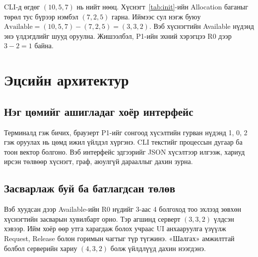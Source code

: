  CLI-д өгдөг $(10,5,7)$ нь нийт нөөц. Хүснэгт~\ref{tab:init}-ийн Allocation баганыг төрөл тус бүрээр нэмбэл $(7,2,5)$ гарна. Иймээс сул нэгж буюу $\mathrm{Available}=(10,5,7)-(7,2,5)=(3,3,2)$. Вэб хүснэгтийн Available нүдэнд энэ үлдэгдлийг шууд оруулна. Жишээлбэл, P1-ийн эхний хэрэгцээ R0 дээр $3-2=1$ байна.
\newpage
\section{Эцсийн архитектур}
\subsection{Нэг цөмийг ашигладаг хоёр интерфейс}
Терминалд  гэж бичих, браузерт P1-ийг сонгоод хүсэлтийн гурван нүдэнд 1, 0, 2 гэж оруулах нь цөмд ижил үйлдэл хүргэнэ. CLI текстийг процессын дугаар ба тоон вектор болгоно. Вэб интерфейс эдгээрийг JSON хүсэлтээр илгээж, хариуд ирсэн төлвөөр хүснэгт, граф, аюулгүй дарааллыг дахин зурна.


\subsection{Засварлаж буй ба батлагдсан төлөв}
Вэб хуудсан дээр Available-ийн R0 нүдийг 3-аас 4 болгоход тоо эхлээд зөвхөн хүснэгтийн засварын хувилбарт орно. Тэр агшинд серверт $(3,3,2)$ үлдсэн хэвээр. Ийм хоёр өөр утга харагдаж болох учраас UI анхааруулга үзүүлж Request, Release болон горимын чагтыг түр түгжинэ. «Шалгах» амжилттай болбол серверийн хариу $(4,3,2)$ болж үйлдлүүд дахин нээгдэнэ.

